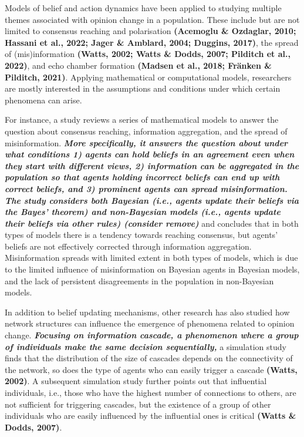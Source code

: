 \documentclass[
  11pt,
]{article}
\begin{document}
Models of belief and action dynamics have been applied to studying
multiple themes associated with opinion change in a population. These
include but are not limited to consensus reaching and polarisation
\textbf{(Acemoglu \& Ozdaglar, 2010; Hassani et al., 2022; Jager \&
Amblard, 2004; Duggins, 2017)}, the spread of (mis)information
\textbf{(Watts, 2002; Watts \& Dodds, 2007; Pilditch et al., 2022)}, and
echo chamber formation \textbf{(Madsen et al., 2018; Fränken \&
Pilditch, 2021)}. Applying mathematical or computational models,
researchers are mostly interested in the assumptions and conditions
under which certain phenomena can arise.

For instance, a study reviews a series of mathematical models to answer
the question about consensus reaching, information aggregation, and the
spread of misinformation. \textbf{\emph{More specifically, it answers
the question about under what conditions 1) agents can hold beliefs in
an agreement even when they start with different views, 2) information
can be aggregated in the population so that agents holding incorrect
beliefs can end up with correct beliefs, and 3) prominent agents can
spread misinformation. The study considers both Bayesian (i.e., agents
update their beliefs via the Bayes' theorem) and non-Bayesian models
(i.e., agents update their beliefs via other rules) (consider remove)}}
and concludes that in both types of models there is a tendency towards
reaching consensus, but agents' beliefs are not effectively corrected
through information aggregation. Misinformation spreads with limited
extent in both types of models, which is due to the limited influence of
misinformation on Bayesian agents in Bayesian models, and the lack of
persistent disagreements in the population in non-Bayesian models.

In addition to belief updating mechanisms, other research has also
studied how network structures can influence the emergence of phenomena
related to opinion change. \textbf{\emph{Focusing on information
cascade, a phenomenon where a group of individuals make the same
decision sequentially,}} a simulation study finds that the distribution
of the size of cascades depends on the connectivity of the network, so
does the type of agents who can easily trigger a cascade \textbf{(Watts,
2002)}. A subsequent simulation study further points out that
influential individuals, i.e., those who have the highest number of
connections to others, are not sufficient for triggering cascades, but
the existence of a group of other individuals who are easily influenced
by the influential ones is critical \textbf{(Watts \& Dodds, 2007)}.
\end{document}
